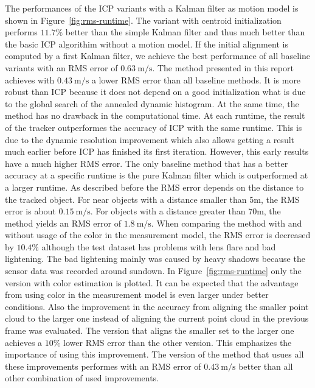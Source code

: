 \documentclass[twoside,a4paper,article]{combine}
\begin{document}
The performances of the ICP variants with a Kalman filter as motion
model is shown in Figure~\ref{fig:rms-runtime}. The variant with
centroid initialization performs $11.7\%$ better than the simple
Kalman filter and thus much better than the basic ICP algorithim
without a motion model. If the initial alignment is computed by a
first Kalman filter, we achieve the best performance of all baseline
variants with an RMS error of $0.63\mathrm{~m/s}$. The method
presented in this report achieves with $0.43\mathrm{~m/s}$ a lower RMS
error than all baseline methods. It is more robust than ICP because it
does not depend on a good initialization what is due to the global
search of the annealed dynamic histogram. At the same time, the method
has no drawback in the computational time. At each runtime, the result
of the tracker outperformes the accuracy of ICP with the same
runtime. This is due to the dynamic resolution improvement which also
allows getting a result much earlier before ICP has finished its first
iteration. However, this early results have a much higher RMS
error. The only baseline method that has a better accuracy at a
specific runtime is the pure Kalman filter which is outperformed at a
larger runtime. As described before the RMS error depends on the
distance to the tracked object. For near objects with a distance
smaller than $5$m, the RMS error is about $0.15\mathrm{~m/s}$. For
objects with a distance greater than $70$m, the method yields an RMS
error of $1.8\mathrm{~m/s}$. When comparing the method with and
without usage of the color in the measurement model, the RMS error is
decreased by $10.4\%$ although the test dataset has problems with lens
flare and bad lightening. The bad lightening mainly was caused by heavy
shadows because the sensor data was recorded around sundown.
In Figure~\ref{fig:rms-runtime} only the version with color
estimation is plotted. It can be expected that the advantage from
using color in the measurement model is even larger under better
conditions.  Also the improvement in the accuracy from aligning the
smaller point cloud to the larger one instead of aligning the current
point cloud in the previous frame was evaluated. The version that
aligns the smaller set to the larger one achieves a $10\%$ lower RMS
error than the other version. This emphasizes the importance of using
this improvement.
The version of the method that usues all these improvements performes
with an RMS error of $0.43\mathrm{~m/s}$ better than all other
combination of used improvements.
\end{document}
